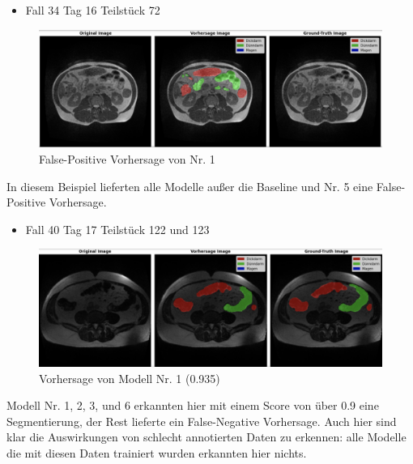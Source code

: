 \begin{itemize}
\item  Fall 34 Tag 16 Teilstück 72
\end{itemize}
\begin{figure}[H]
	\begin{center}
		\includegraphics[width=400pt]{LaTex/bilder/case34_day16_slice_0072_no1.png}
		\caption{ False-Positive Vorhersage von Nr. 1 }\label{Fig:7vs1}
	\end{center}
\end{figure}

In diesem Beispiel lieferten alle Modelle außer die Baseline und Nr. 5 eine False-Positive Vorhersage.
\pagebreak

\begin{itemize}
\item Fall 40 Tag 17 Teilstück 122 und 123
\end{itemize}
\begin{figure}[H]
	\begin{center}
		\includegraphics[width=400pt]{LaTex/bilder/case40_day17_slice_0122_no1.png}
		\caption{ Vorhersage von Modell Nr. 1 (0.935) }\label{Fig:analysis-clean-data-weak}
	\end{center}
\end{figure}
Modell Nr. 1, 2, 3, und 6 erkannten hier mit einem Score von über 0.9 eine Segmentierung, der Rest lieferte ein False-Negative Vorhersage. Auch hier sind klar die Auswirkungen von schlecht annotierten Daten zu erkennen: alle Modelle die mit diesen Daten trainiert wurden erkannten hier nichts.

